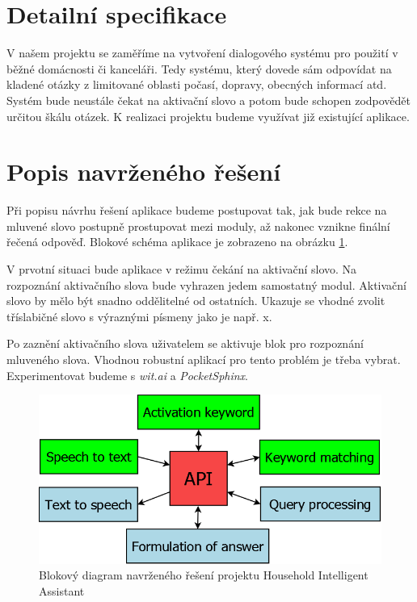 \documentclass[12pt,a4paper]{article}
\begin{document}
\section*{Detailní specifikace}
V našem projektu se zaměříme na vytvoření dialogového systému pro použití v běžné domácnosti či kanceláři. Tedy systému, který dovede sám odpovídat na kladené otázky z limitované oblasti počasí, dopravy, obecných informací atd. Systém bude neustále čekat na aktivační slovo a potom bude schopen zodpovědět určitou škálu otázek. K realizaci projektu budeme využívat již existující aplikace. 

\section*{Popis navrženého řešení}
Při popisu návrhu řešení aplikace budeme postupovat tak, jak bude rekce na mluvené slovo postupně prostupovat mezi moduly, až nakonec vznikne finální řečená odpověď. Blokové schéma aplikace je zobrazeno na obrázku \ref{fig:diagram api}.

V prvotní situaci bude aplikace v režimu čekání na aktivační slovo. Na rozpoznání aktivačního slova bude vyhrazen jedem samostatný modul. Aktivační slovo by mělo být snadno oddělitelné od ostatních. Ukazuje se vhodné zvolit tříslabičné slovo s výraznými písmeny jako je např. x.

Po zaznění aktivačního slova uživatelem se aktivuje blok pro rozpoznání mluveného slova. Vhodnou robustní aplikací pro tento problém je třeba vybrat. Experimentovat budeme s \textit{wit.ai} a \textit{PocketSphinx}.

\begin{figure}[h!]
	\begin{center}
	\includegraphics[width = 14cm]{Diagram_API.png}
	\caption{Blokový diagram navrženého řešení projektu Household Intelligent Assistant}
	\label{fig:diagram api}
	\end{center}
\end{figure}
\end{document}
